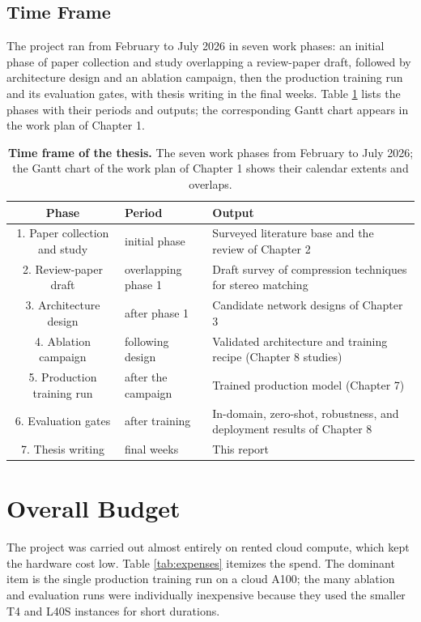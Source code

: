 \subsection{Time Frame}
The project ran from February to July 2026 in seven work phases: an
initial phase of paper collection and study overlapping a review-paper
draft, followed by architecture design and an ablation campaign, then
the production training run and its evaluation gates, with thesis
writing in the final weeks. Table \ref{tab:timeframe} lists the phases
with their periods and outputs; the corresponding Gantt chart appears in
the work plan of Chapter 1.

\begin{table}[!htbp]
\centering
\caption{\textbf{Time frame of the thesis.} The seven work phases from February to July 2026; the Gantt chart of the work plan of Chapter 1 shows their calendar extents and overlaps.}
\label{tab:timeframe}
\small
\begin{tabular}{clp{6.6cm}}
\toprule
Phase & Period & Output\\
\midrule
1. Paper collection and study & initial phase & Surveyed literature base and the review of Chapter 2\\
2. Review-paper draft & overlapping phase 1 & Draft survey of compression techniques for stereo matching\\
3. Architecture design & after phase 1 & Candidate network designs of Chapter 3\\
4. Ablation campaign & following design & Validated architecture and training recipe (Chapter 8 studies)\\
5. Production training run & after the campaign & Trained production model (Chapter 7)\\
6. Evaluation gates & after training & In-domain, zero-shot, robustness, and deployment results of Chapter 8\\
7. Thesis writing & final weeks & This report\\
\bottomrule
\end{tabular}
\end{table}

\FloatBarrier
\section{Overall Budget}
The project was carried out almost entirely on rented cloud compute, which
kept the hardware cost low. Table \ref{tab:expenses} itemizes the spend.
The dominant item is the single production training run on a cloud A100;
the many ablation and evaluation runs were individually inexpensive
because they used the smaller T4 and L40S instances for short durations.

